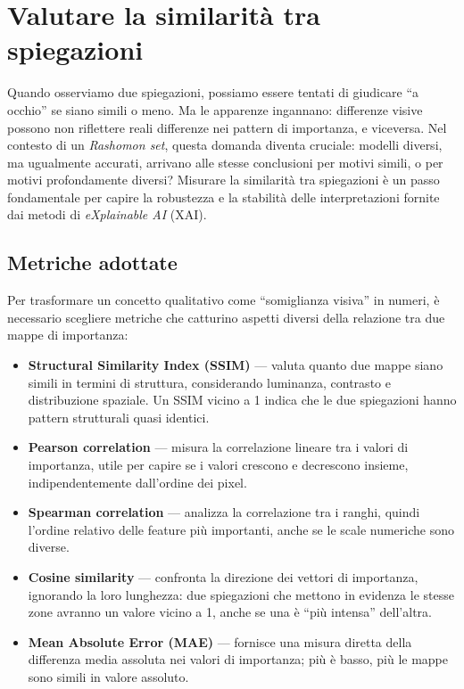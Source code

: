 \documentclass{article}
\begin{document}
\section{Valutare la similarità tra spiegazioni}

Quando osserviamo due spiegazioni, possiamo essere tentati di giudicare ``a
occhio'' se siano simili o meno. Ma le apparenze ingannano: differenze visive
possono non riflettere reali differenze nei pattern di importanza, e viceversa.
Nel contesto di un \emph{Rashomon set}, questa domanda diventa cruciale:
modelli diversi, ma ugualmente accurati, arrivano alle stesse conclusioni per
motivi simili, o per motivi profondamente diversi? Misurare la similarità tra
spiegazioni è un passo fondamentale per capire la robustezza e la stabilità
delle interpretazioni fornite dai metodi di \emph{eXplainable AI} (XAI).

\subsection{Metriche adottate}
Per trasformare un concetto qualitativo come ``somiglianza visiva'' in numeri,
è necessario scegliere metriche che catturino aspetti diversi della relazione
tra due mappe di importanza:

\begin{itemize}
      \item \textbf{Structural Similarity Index (SSIM)} — valuta quanto due mappe siano simili in termini di struttura, considerando luminanza, contrasto e distribuzione spaziale. Un SSIM vicino a 1 indica che le due spiegazioni hanno pattern strutturali quasi identici.
      \item \textbf{Pearson correlation} — misura la correlazione lineare tra i valori di importanza, utile per capire se i valori crescono e decrescono insieme, indipendentemente dall’ordine dei pixel.
      \item \textbf{Spearman correlation} — analizza la correlazione tra i ranghi, quindi l’ordine relativo delle feature più importanti, anche se le scale numeriche sono diverse.
      \item \textbf{Cosine similarity} — confronta la direzione dei vettori di importanza, ignorando la loro lunghezza: due spiegazioni che mettono in evidenza le stesse zone avranno un valore vicino a 1, anche se una è “più intensa” dell’altra.
      \item \textbf{Mean Absolute Error (MAE)} — fornisce una misura diretta della differenza media assoluta nei valori di importanza; più è basso, più le mappe sono simili in valore assoluto.
\end{itemize}
\end{document}
